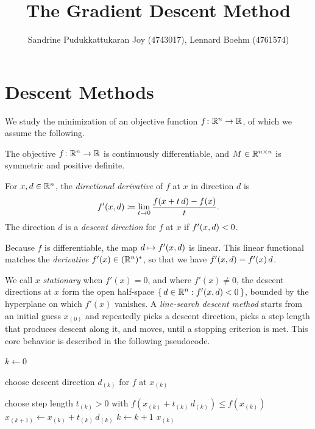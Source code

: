 \documentclass{article}
\title{The Gradient Descent Method}
\author{Sandrine Pudukkattukaran Joy (4743017), Lennard Boehm (4761574)}
\newcommand{\iter}[2]{#1_{(#2)}}           %
\begin{document}
\maketitle

\section{Descent Methods}
\label{section:descent}
We study the minimization of an objective function $f \colon \mathbb{R}^n \to \mathbb{R}$, of which we assume the following.

\begin{assumption}
	\label{assumption:standing}
	The objective $f \colon \mathbb{R}^n \to \mathbb{R}$ is continuously differentiable, and $M \in \mathbb{R}^{n \times n}$ is symmetric and positive definite.
\end{assumption}

\begin{definition}
	\label{definition:descent}
	For $x, d \in \mathbb{R}^n$, the \emph{directional derivative} of $f$ at $x$ in direction $d$ is
	\begin{equation*}
		f'(x, d) \coloneqq \lim_{t \to 0} \frac{f(x + t \, d) - f(x)}{t}.
	\end{equation*}
	The direction $d$ is a \emph{descent direction} for $f$ at $x$ if $f'(x, d) < 0$.
\end{definition}

\begin{remark}
	Because $f$ is differentiable, the map $d \mapsto f'(x, d)$ is linear.
	This linear functional matches the \emph{derivative} $f'(x) \in (\mathbb{R}^n)^*$, so that we have $f'(x, d) = f'(x) \, d$.
\end{remark}
We call $x$ \emph{stationary} when $f'(x) = 0$, and where $f'(x) \neq 0$, the descent directions at $x$ form the open half-space $\{\, d \in \mathbb{R}^n : f'(x, d) < 0 \,\}$, bounded by the hyperplane on which $f'(x)$ vanishes.
A \emph{line-search descent method} starts from an initial guess $\iter{x}{0}$ and repeatedly picks a descent direction, picks a step length that produces descent along it, and moves, until a stopping criterion is met.
This core behavior is described in the following pseudocode.

\begin{algorithm} \hfill
\label{algorithm:descent}
	\begin{algorithmic}[1]
		\Procedure{DescentMethod}{$f, \iter{x}{0}$}
			\State $k \gets 0$
		
			\State  choose descent direction $\iter{d}{k}$ 
				\label{algorithm:descent:direction}for $f$ at $\iter{x}{k}$
				
				\State  choose step length $\iter{t}{k} > 0$ with $f(\iter{x}{k} + \iter{t}{k} \, \iter{d}{k}) \le f(\iter{x}{k})$
				\label{algorithm:descent:steplength}
				\State $\iter{x}{k+1} \gets \iter{x}{k} + \iter{t}{k} \, \iter{d}{k}$
				\State $k \gets k + 1$
			\EndWhile
			\State \Return $\iter{x}{k}$
		\EndProcedure
	\end{algorithmic}
\end{algorithm}
\end{document}
